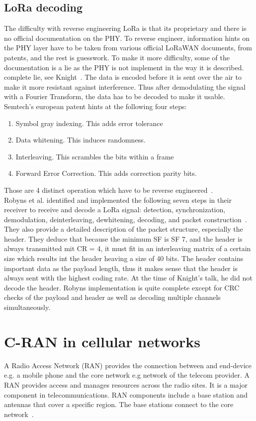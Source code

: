 \section{LoRa decoding}
The difficulty with reverse engineering LoRa is that its proprietary and
there is no official documentation on the PHY. To reverse engineer, information hints
on the PHY layer have to be taken from various official LoRaWAN documents, from patents, and the 
rest is guesswork. To make it more difficulty, some of the documentation is a lie as the PHY is not implement 
in the way it is described. 
complete lie, see Knight~\cite{knight_youtube}. 
The data is encoded before it is sent over the air to make it more resistant against interference.
Thus after demodulating the signal with a Fourier Transform, the data has to be decoded to make it usable.
Semtech's european patent hints at the following four steps:
\begin{enumerate}
    \item Symbol gray indexing. This adds error tolerance
    \item Data whitening. This induces randomness.
    \item Interleaving. This scrambles the bits within a frame
    \item Forward Error Correction. This adds correction parity bits.
    
\end{enumerate}
Those are 4 distinct operation which have to be reverse engineered~\cite{knight_youtube}.\\
Robyns et al. identified and implemented the following seven steps in their receiver to 
receive and decode a LoRa signal: detection, synchronization, demodulation, deinterleaving, dewhitening,
decoding, and packet construction~\cite{robyns_implementation}. They also provide a detailed description of the 
packet structure, especially the header. They deduce that because the minimum SF is SF 7, and the header is always 
transmitted mit CR = 4, it must fit in an interleaving matrix of a certain size which results int the header heaving a size of 
40 bits. The header contains important data as the payload length, thus it makes sense that the header is always sent with the highest
coding rate.
At the time of Knight's talk, he did not decode the header. Robyns implementation is quite complete except for CRC checks of the payload and header
as well as decoding multiple channels simultaneously. 

\chapter{C-RAN in cellular networks}
A Radio Access Network (RAN) provides the connection between and end-device e.g. a mobile phone and the core network e.g network of the telecom provider.
A RAN provides access and manages resources across the radio sites. It is a major component in telecommunications. RAN components include a base station and antennas
that cover a specific region. The base stations connect to the core network~\cite{what_is_ran}.

